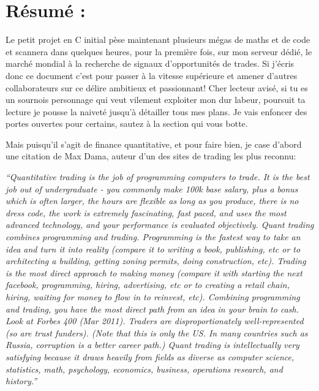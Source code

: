 \section*{Résumé :}


Le petit projet en C initial pèse maintenant plusieurs mégas de maths et de
code et scannera dans quelques heures, pour la première fois, sur mon
serveur dédié, le marché mondial à
la recherche de signaux d'opportunités de trades. Si j'écris donc ce
document c'est pour passer à la vitesse supérieure et amener d'autres
collaborateurs sur ce délire ambitieux et passionnant! Cher lecteur
avisé, si tu es un sournois personnage qui veut vilement
exploiter mon dur labeur, poursuit ta lecture je pousse la naiveté jusqu'à
détailler tous mes plans.\newline
Je vais enfoncer des portes ouvertes pour certains, sautez à la section qui
vous botte.\newline


Mais puisqu'il s'agit de finance quantitative, et pour faire bien, je case
d'abord une citation de Max Dama, auteur d'un des sites de trading les plus
reconnu:\newline

\textit{``Quantitative trading is the job of programming computers to trade. It is
the best job out of undergraduate - you commonly make 100k base salary,
plus a bonus which is often larger, the hours are flexible as long as you
produce, there is no dress code, the work is extremely fascinating, fast
paced, and uses the most advanced technology, and your performance is
evaluated objectively.\newline
\newline
Quant trading combines programming and trading. Programming is the fastest
way to take an idea and turn it into reality (compare it to writing a book,
publishing, etc or to architecting a building, getting zoning permits,
doing construction, etc). Trading is the most direct approach to making
money (compare it with starting the next facebook, programming, hiring,
advertising, etc or to creating a retail chain, hiring, waiting for money
to flow in to reinvest, etc). Combining programming and trading, you have
the most direct path from an idea in your brain to cash.\newline
\newline
Look at Forbes 400 (Mar 2011). Traders are disproportionately
well-represented (so are trust funders). (Note that this is only the US.
In many countries such as Russia, corruption is a better career path.)\newline
\newline
Quant trading is intellectually very satisfying because it draws heavily
from fields as diverse as computer science, statistics, math, psychology,
economics, business, operations research, and history.''}\newline
\newline


